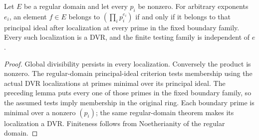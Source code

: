 \begin{theorem}\label{thm:fixed-boundary-localization-detection}
\leanok
{}
Let $E$ be a regular domain and let every $p_i$ be nonzero. For arbitrary
exponents $e_i$, an element $f\in E$ belongs to $(\prod_i p_i^{e_i})$
if and only if it belongs to that principal ideal after localization
at every prime in the fixed boundary family. Every such localization
is a DVR, and the finite testing family is independent of $e$.
\end{theorem}
\begin{proof}
Global divisibility persists in every localization. Conversely the
product is nonzero. The regular-domain principal-ideal criterion tests
membership using the actual DVR localizations at primes minimal over
its principal ideal. The preceding lemma puts every one of those
primes in the fixed boundary family, so the assumed tests imply
membership in the original ring. Each boundary prime is minimal over
a nonzero $(p_i)$; the same regular-domain theorem makes its localization
a DVR. Finiteness follows from Noetherianity of the regular domain.
\end{proof}
